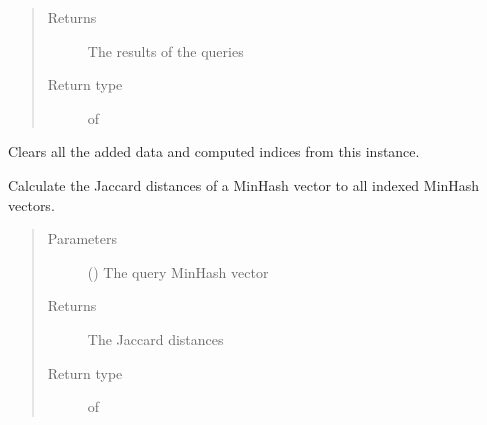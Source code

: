 \documentclass[letterpaper,10pt,english]{sphinxmanual}
\begin{document}
\begin{fulllineitems}
\begin{fulllineitems}
\begin{quote}
\begin{description}
\begin{itemize}
\end{itemize}

\item[{Returns}] \leavevmode
The results of the queries

\item[{Return type}] \leavevmode
{} of 

\end{description}\end{quote}

\end{fulllineitems}


\begin{fulllineitems}
\label{\detokenize{documentation:tmap.LSHForest.clear}}
Clears all the added data and computed indices from this {\hyperref[\detokenize{documentation:tmap.LSHForest}]{}} instance.

\end{fulllineitems}


\begin{fulllineitems}
\label{\detokenize{documentation:tmap.LSHForest.get_all_distances}}
Calculate the Jaccard distances of a MinHash vector to all indexed MinHash vectors.
\begin{quote}\begin{description}
\item[{Parameters}] \leavevmode
{} () \textendash{} The query MinHash vector

\item[{Returns}] \leavevmode
The Jaccard distances

\item[{Return type}] \leavevmode
{} of 


\end{description}
\end{quote}
\end{fulllineitems}
\end{fulllineitems}
\end{document}
